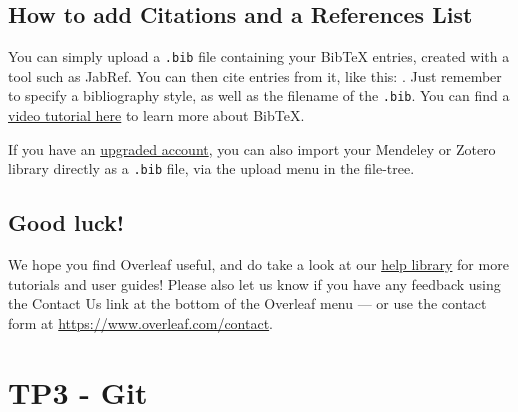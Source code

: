 \documentclass{article}
\begin{document}
\subsection{How to add Citations and a References List}

You can simply upload a \verb|.bib| file containing your BibTeX entries, created with a tool such as JabRef. You can then cite entries from it, like this: \cite{greenwade93}. Just remember to specify a bibliography style, as well as the filename of the \verb|.bib|. You can find a \href{https://www.overleaf.com/help/97-how-to-include-a-bibliography-using-bibtex}{video tutorial here} to learn more about BibTeX.

If you have an \href{https://www.overleaf.com/user/subscription/plans}{upgraded account}, you can also import your Mendeley or Zotero library directly as a \verb|.bib| file, via the upload menu in the file-tree.

\subsection{Good luck!}

We hope you find Overleaf useful, and do take a look at our \href{https://www.overleaf.com/learn}{help library} for more tutorials and user guides! Please also let us know if you have any feedback using the Contact Us link at the bottom of the Overleaf menu --- or use the contact form at \url{https://www.overleaf.com/contact}.

\section{TP3 - Git}

\subsection{}
\subsection{}
\subsection{}



\end{document}
